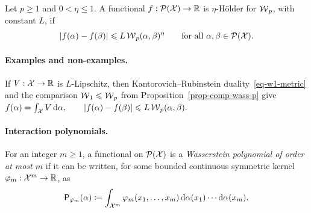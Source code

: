 \begin{defn}\label{def-wasserstein-holder-functional}
Let \(p\geq1\) and \(0<\eta\leq1\). A functional \(f:\mathcal{P}(\mathcal{X})\to\mathbb{R}\) is \(\eta\)-H\"older for \(\operatorname{\mathcal{W}}_p\), with constant \(L\), if
\begin{equation}\label{eq-wasserstein-holder-functional}
|f(\alpha)-f(\beta)|
\leqslant
L\operatorname{\mathcal{W}}_p(\alpha,\beta)^\eta
\qquad
\text{for all }\alpha,\beta\in\mathcal{P}(\mathcal{X}).
\end{equation}
\end{defn}
\paragraph{Examples and non-examples.}
If \(V:\mathcal{X}\to\mathbb{R}\) is \(L\)-Lipschitz, then Kantorovich--Rubinstein duality~\eqref{eq-w1-metric} and the comparison \(\operatorname{\mathcal{W}}_1\leqslant\operatorname{\mathcal{W}}_p\) from Proposition~\ref{prop-comp-wass-p} give
\(f(\alpha)=\int_{\mathcal{X}} V\,\mathrm{d}\alpha, \qquad |f(\alpha)-f(\beta)|\leqslant L\operatorname{\mathcal{W}}_p(\alpha,\beta).\)
\paragraph{Interaction polynomials.}
\begin{defn}\label{def-wasserstein-polynomial}
For an integer \(m\geq1\), a functional on \(\mathcal{P}(\mathcal{X})\) is a \emph{Wasserstein polynomial of order at most \(m\)} if it can be written, for some bounded continuous symmetric kernel \(\varphi_m:\mathcal{X}^m\to\mathbb{R}\), as
\begin{equation}\label{eq-wasserstein-interaction-polynomial}
\mathsf P_{\varphi_m}(\alpha)
\coloneqq
\int_{\mathcal{X}^m}\varphi_m(x_1,\ldots,x_m)
\,\mathrm{d}\alpha(x_1)\cdots\mathrm{d}\alpha(x_m).
\end{equation}
\end{defn}
